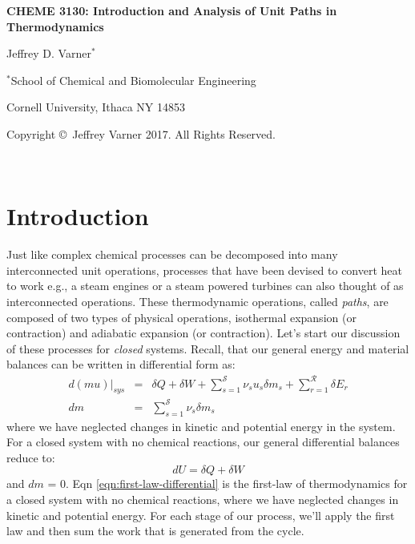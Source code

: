 \documentclass[11pt]{article}
\theoremstyle{definition}
\begin{document}
{\par\centering\textbf{\Large CHEME 3130: Introduction and Analysis of Unit Paths in Thermodynamics}}
\vspace{0.2in}
{\par \centering \large{Jeffrey D. Varner$^{*}$}}
\vspace{0.05in}
{\par \centering \large{$^{*}$}School of Chemical and Biomolecular Engineering}
{\par \centering \large{Cornell University, Ithaca NY 14853}}
\vspace{0.1in}
{\par \centering \small{Copyright \copyright\ Jeffrey Varner 2017. All Rights Reserved.}}\\

\date{}
\thispagestyle{empty}

\setcounter{page}{1}



\section*{Introduction}
Just like complex chemical processes can be decomposed into many interconnected unit operations, processes that have been devised to convert heat to work e.g., a steam engines or a steam powered turbines
can also thought of as interconnected operations. These thermodynamic operations, called \textit{paths}, are composed of two types of physical operations, isothermal expansion (or contraction) and adiabatic expansion (or contraction). Let's start our discussion of these processes for \textit{closed} systems. Recall, that our general energy and material balances can be written in
differential form as:
\begin{eqnarray}\label{eqn:energy-balance-precursor-internal}
d\left(mu\right)\Bigr|_{sys} &=& \delta{Q}+\delta{W}+\sum_{s=1}^{\mathcal{S}}\nu_{s}u_{s}\delta{m}_{s} + \sum_{r=1}^{\mathcal{R}}\delta E_{r}\\\label{eqn:material-balance-precursor-internal}
dm &=& \sum_{s=1}^{\mathcal{S}}\nu_{s}\delta{m}_{s}
\end{eqnarray}where we have neglected changes in kinetic and potential energy in the system. For a closed system with no chemical reactions, our general differential balances reduce to:
\begin{equation}\label{eqn:first-law-differential}
dU = \delta{Q}+\delta{W}
\end{equation}and $dm$ = 0. Eqn \eqref{eqn:first-law-differential} is the first-law of thermodynamics for a closed system with no chemical reactions,
where we have neglected changes in kinetic and potential energy. For each stage of our process, we'll apply the first law and then sum the work that is generated from the cycle.
\end{document}
